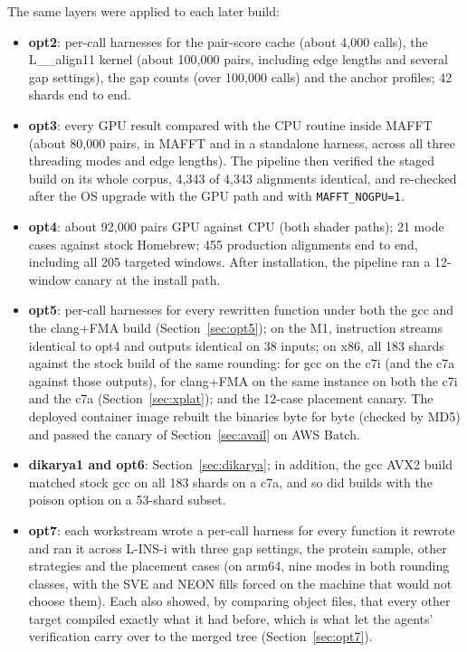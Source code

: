 \documentclass[11pt]{article}
\newcommand{\code}[1]{\texttt{#1}}
\begin{document}
The same layers were applied to each later build:
\begin{itemize}
\item \textbf{opt2}: per-call harnesses for the pair-score cache (about 4{,}000 calls), the
  L\_\_align11 kernel (about 100{,}000 pairs, including edge lengths and several gap
  settings), the gap counts (over 100{,}000 calls) and the anchor profiles; 42 shards end to end.
\item \textbf{opt3}: every GPU result compared with the CPU routine inside MAFFT (about 80{,}000
  pairs, in MAFFT and in a standalone harness, across all three threading modes and edge lengths). The pipeline then verified the
  staged build on its whole corpus, 4{,}343 of 4{,}343 alignments identical, and re-checked
  after the OS upgrade with the GPU path and with \code{MAFFT\_NOGPU=1}.
\item \textbf{opt4}: about 92{,}000 pairs GPU against CPU (both shader paths); 21 mode cases
  against stock Homebrew; 455 production alignments end to end, including all 205 targeted
  windows. After installation, the pipeline ran a 12-window canary at the install path.
\item \textbf{opt5}: per-call harnesses for every rewritten function under both the gcc and the
  clang+FMA build (Section~\ref{sec:opt5}); on the M1, instruction streams identical to opt4
  and outputs identical on 38 inputs; on x86, all 183 shards against the stock build of the
  same rounding: for gcc on the c7i (and the c7a against those outputs), for clang+FMA on the
  same instance on both the c7i and the c7a (Section~\ref{sec:xplat}); and the 12-case
  placement canary. The deployed container image rebuilt the binaries byte for byte (checked by MD5)
  and passed the canary of Section~\ref{sec:avail} on AWS Batch.
\item \textbf{dikarya1 and opt6}: Section~\ref{sec:dikarya}; in addition, the gcc AVX2 build
  matched stock gcc on all 183 shards on a c7a, and so did builds with the poison option on a
  53-shard subset.
\item \textbf{opt7}: each workstream wrote a per-call harness for every function it rewrote and
  ran it across L-INS-i with three gap settings, the protein sample, other strategies and the
  placement cases (on arm64, nine modes in both rounding classes, with the SVE and NEON fills
  forced on the machine that would not choose them). Each also showed, by comparing object
  files, that every other target compiled exactly what it had before, which is what let the
  agents' verification carry over to the merged tree (Section~\ref{sec:opt7}).

\end{itemize}
\end{document}
